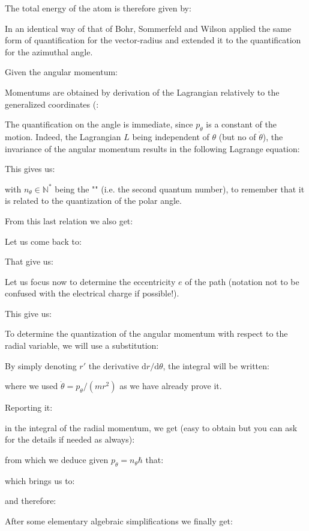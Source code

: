 	The total energy of the atom is therefore given by:
	
	In an identical way of that of Bohr, Sommerfeld and Wilson applied the same form of quantification for the vector-radius and extended it to the quantification for the azimuthal angle.
	
	Given the angular momentum:
	
	Momentums are obtained by derivation of the Lagrangian relatively to the generalized coordinates (:
	
	The quantification on the angle is immediate, since $p_\theta$ is a constant of the motion. Indeed, the Lagrangian $L$ being independent of $\theta$ (but no of $\dot{\theta}$), the invariance of the angular momentum results in the following Lagrange equation:
	
	This gives us:
	
	with $n_\theta \in \mathbb{N}^*$ being the "" (i.e. the second quantum number), to remember that it is related to the quantization of the polar angle.
	
	From this last relation we also get:
	
	Let us come back to:
	
	That give us:
	
	Let us focus now to determine the eccentricity $e$ of the path (notation not to be confused with the electrical charge if possible!).
	
	This give us:
	
	To determine the quantization of the angular momentum with respect to the radial variable, we will use a substitution:
	
	By simply denoting $r'$ the derivative $\mathrm{d}r/\mathrm{d}\theta$, the integral will be written:
	
	where we used $\dot{\theta}=p_\theta/(mr^2)$ as we have already prove it.
	
	Reporting it:
	
	in the integral of the radial momentum, we get (easy to obtain but you can ask for the details if needed as always):
	
	from which we deduce given $p_\theta=n_\theta\hbar$ that:
	
	which brings us to:
	
	and therefore:
	
	After some elementary algebraic simplifications we finally get:
	
